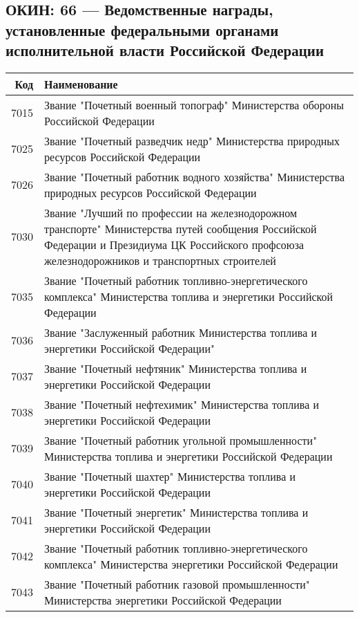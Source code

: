 \documentclass[10pt, a4paper, titlepage]{article}
\begin{document}
\subsection{ОКИН: 66 — Ведомственные награды, установленные федеральными органами исполнительной власти Российской Федерации}

\begin{center}
    \begin{longtable}{rp{}}
        \hline
        \textbf{Код} & \textbf{Наименование} \\ \hline
        7015 & Звание "Почетный военный топограф" Министерства обороны Российской Федерации \\
        7025 & Звание "Почетный разведчик недр" Министерства природных ресурсов Российской Федерации \\
        7026 & Звание "Почетный работник водного хозяйства" Министерства природных ресурсов Российской Федерации \\
        7030 & Звание "Лучший по профессии на железнодорожном транспорте" Министерства путей сообщения Российской Федерации и Президиума ЦК Российского профсоюза железнодорожников и транспортных строителей \\
        7035 & Звание "Почетный работник топливно-энергетического комплекса" Министерства топлива и энергетики Российской Федерации \\
        7036 & Звание "Заслуженный работник Министерства топлива и энергетики Российской Федерации" \\
        7037 & Звание "Почетный нефтяник" Министерства топлива и энергетики Российской Федерации \\
        7038 & Звание "Почетный нефтехимик" Министерства топлива и энергетики Российской Федерации \\
        7039 & Звание "Почетный работник угольной промышленности" Министерства топлива и энергетики Российской Федерации \\
        7040 & Звание "Почетный шахтер" Министерства топлива и энергетики Российской Федерации \\
        7041 & Звание "Почетный энергетик" Министерства топлива и энергетики Российской Федерации \\
        7042 & Звание "Почетный работник топливно-энергетического комплекса" Министерства энергетики Российской Федерации \\
        7043 & Звание "Почетный работник газовой промышленности" Министерства энергетики Российской Федерации \\

\end{longtable}
\end{center}
\end{document}
